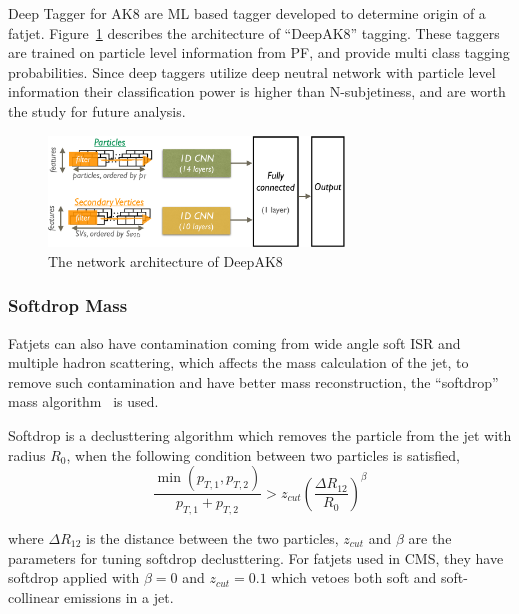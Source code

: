 Deep Tagger for AK8 are \gls{ML} based tagger developed to determine
origin of a fatjet. Figure~\ref{fig:cms-deepAK8-arch}
describes the architecture of ``DeepAK8'' tagging. These taggers are trained on particle level information
from \gls{PF}, and provide multi class tagging probabilities.
Since deep taggers utilize deep neutral network with particle level
information their classification power is higher than N-subjetiness,
and are worth the study for future analysis.

\begin{figure}[!ht]
  \centering
  \includegraphics[width=0.7\textwidth]{figures/CMS_JME_18_002_Figure_009.pdf}
  \caption[The network architecture of DeepAK8]%
  {The network architecture of DeepAK8~\cite{cms-jme-deep-tagger}}%
  \label{fig:cms-deepAK8-arch}
\end{figure}

\subsubsection{
  Softdrop Mass
}

Fatjets can also have contamination coming from wide angle
soft \gls{ISR} and multiple hadron scattering,
which affects the mass calculation of the jet, to remove
such contamination and have better mass reconstruction, the
``softdrop'' mass algorithm~\cite{softdrop-mass-2014} is used.

Softdrop is a declusttering algorithm which removes the particle from the jet
with radius \( R_0 \), when the following condition between two particles is satisfied,
%
\begin{equation}
  \frac{\min(p_{T,1}, p_{T,2})}{p_{T,1} + p_{T,2}} > z_{cut} {\left( \frac{\Delta R_{12}}{R_0} \right)}^{\beta}
\end{equation}

where \( \Delta R_{12} \) is the distance between the two particles, \( z_{cut} \)
and \( \beta \) are the parameters for tuning softdrop declusttering.
For fatjets used in \gls{CMS}, they have softdrop applied with
\( \beta = 0\) and \( z_{cut} = 0.1\) which vetoes both soft
and soft-collinear emissions in a jet.

